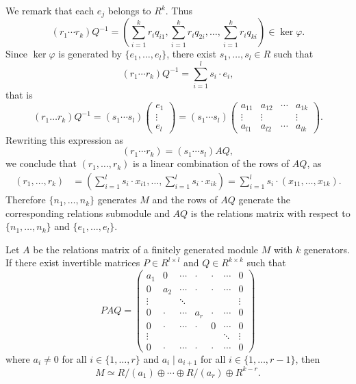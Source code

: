 We remark that each $e_j$ belongs to $R^k$. Thus 
\[
(r_1\cdots r_k)Q^{-1} = \left(\sum_{i=1}^k r_i q_{i1},\sum_{i=1}^k r_i q_{2i},\dots,\sum_{i=1}^k r_i q_{ki}\right)\in \ker\varphi.
\]
Since $\ker\varphi$ is generated by $\{e_1,\dots,e_l\}$, there exist 
$s_1,\dots,s_l\in R$ such that 
\[
	(r_1\cdots r_k)Q^{-1}=\sum_{i=1}^l s_i\cdot e_i,
\]
that is 
\[
(r_1\dots r_k)Q^{-1}=(s_1\cdots s_l)\begin{pmatrix}e_1\\\vdots\\ e_l\end{pmatrix}
=(s_1\cdots s_l)\begin{pmatrix}
a_{11} & a_{12} & \cdots & a_{1k}\\
\vdots & \vdots & & \vdots\\
a_{l1} & a_{l2} & \cdots & a_{lk}	
\end{pmatrix}
.
\]
Rewriting this expression as 
\[
(r_1\cdots r_k)=(s_1\cdots s_l)AQ,
\]
we conclude that  $(r_1,\dots,r_k)$ is a linear combination of the rows of $AQ$, as 
\begin{align*}
(r_1,\dots,r_k)&=\left(\sum_{i=1}^l s_i\cdot x_{i1},\dots,\sum_{i=1}^l s_i\cdot x_{ik}\right)
=\sum_{i=1}^l s_i\cdot (x_{11},\dots,x_{1k}).
\end{align*}
Therefore $\{n_1,\dots,n_k\}$ generates $M$ and the rows of $AQ$ generate the
corresponding relations submodule and $AQ$ is the relations matrix with respect
to $\{n_1,\dots,n_k\}$ and $\{e_1,\dots,e_l\}$. 

\begin{proposition}
	Let $A$ be the relations matrix of a finitely generated module $M$ with $k$ generators. 
	If there exist invertible matrices $P\in R^{l\times l}$ 
	and $Q\in R^{k\times k}$ such that 
	\[
		PAQ=
		\begin{pmatrix}
			a_1 & 0 & \cdots & \cdot & \cdot & \cdots & 0\\
			0 & a_2 & \cdots & \cdot & \cdot & \cdots & 0\\
			\vdots && \ddots &  & & & \vdots\\	
			0 & \cdot & \cdots & a_r & \cdot & \cdots & 0\\	
			0 & \cdot & \cdots & \cdot & 0 & \cdots & 0\\	
			\vdots &&&&&\ddots &\vdots\\
			0 & \cdot & \cdots & \cdot & \cdot & \cdots & 0
		\end{pmatrix}
	\]
	where $a_i\ne0$ for all $i\in\{1,\dots,r\}$ and  $a_i\mid a_{i+1}$ for all
	$i\in\{1,\dots,r-1\}$,  then 
	\[
		M\simeq R/(a_1)\oplus\cdots\oplus R/(a_r)\oplus R^{k-r}.
	\]
\end{proposition}

